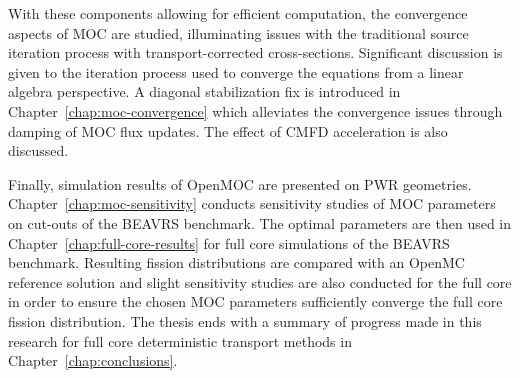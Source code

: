 With these components allowing for efficient computation, the convergence aspects of \ac{MOC} are studied, illuminating issues with the traditional source iteration process with transport-corrected cross-sections. Significant discussion is given to the iteration process used to converge the equations from a linear algebra perspective. A diagonal stabilization fix is introduced in Chapter~\ref{chap:moc-convergence} which alleviates the convergence issues through damping of \ac{MOC} flux updates. The effect of \ac{CMFD} acceleration is also discussed. 

Finally, simulation results of OpenMOC are presented on \ac{PWR} geometries. Chapter~\ref{chap:moc-sensitivity} conducts sensitivity studies of \ac{MOC} parameters on cut-outs of the BEAVRS benchmark. The optimal parameters are then used in Chapter~\ref{chap:full-core-results} for full core simulations of the BEAVRS benchmark. Resulting fission distributions are compared with an OpenMC reference solution and slight sensitivity studies are also conducted for the full core in order to ensure the chosen \ac{MOC} parameters sufficiently converge the full core fission distribution. The thesis ends with a summary of progress made in this research for full core deterministic transport methods in Chapter~\ref{chap:conclusions}.